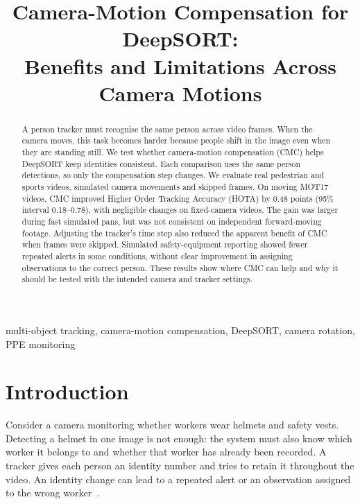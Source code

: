 \documentclass[conference]{IEEEtran}
\begin{document}
\title{Camera-Motion Compensation for DeepSORT:\\Benefits and Limitations Across Camera Motions}
\author{
}
\maketitle

\begin{abstract}
A person tracker must recognise the same person across video frames. When the camera moves, this task becomes harder because people shift in the image even when they are standing still. We test whether camera-motion compensation (CMC) helps DeepSORT keep identities consistent. Each comparison uses the same person detections, so only the compensation step changes. We evaluate real pedestrian and sports videos, simulated camera movements and skipped frames. On moving MOT17 videos, CMC improved Higher Order Tracking Accuracy (HOTA) by 0.48 points (95\% interval 0.18--0.78), with negligible changes on fixed-camera videos. The gain was larger during fast simulated pans, but was not consistent on independent forward-moving footage. Adjusting the tracker's time step also reduced the apparent benefit of CMC when frames were skipped. Simulated safety-equipment reporting showed fewer repeated alerts in some conditions, without clear improvement in assigning observations to the correct person. These results show where CMC can help and why it should be tested with the intended camera and tracker settings.
\end{abstract}

\begin{IEEEkeywords}
multi-object tracking, camera-motion compensation, DeepSORT, camera rotation, PPE monitoring
\end{IEEEkeywords}

\section{Introduction}
Consider a camera monitoring whether workers wear helmets and safety vests. Detecting a helmet in one image is not enough: the system must also know which worker it belongs to and whether that worker has already been recorded. A tracker gives each person an identity number and tries to retain it throughout the video. An identity change can lead to a repeated alert or an observation assigned to the wrong worker~\cite{lee2023ppe,wang2019hazards}.
\end{document}
